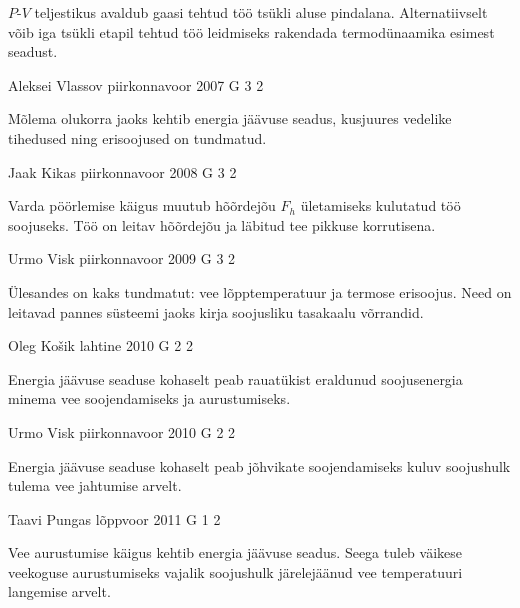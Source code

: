 \documentclass[11pt]{article}
\begin{document}
{{\ifHint
$P$-$V$ teljestikus avaldub gaasi tehtud töö tsükli aluse pindalana. Alternatiivselt võib iga tsükli etapil tehtud töö leidmiseks rakendada termodünaamika esimest seadust.
\fi
}

{Aleksei Vlassov} %
{piirkonnavoor} %
{2007} %
{G 3} %
{2} %
{

\ifHint
Mõlema olukorra jaoks kehtib energia jäävuse seadus, kusjuures vedelike tihedused ning erisoojused on tundmatud.
\fi
}

{Jaak Kikas} %
{piirkonnavoor} %
{2008} %
{G 3} %
{2} %
{

\ifHint
Varda pöörlemise käigus muutub hõõrdejõu $F_h$ ületamiseks kulutatud töö soojuseks. Töö on leitav hõõrdejõu ja läbitud tee pikkuse korrutisena.
\fi
}

{Urmo Visk} %
{piirkonnavoor} %
{2009} %
{G 3} %
{2} %
{

\ifHint
Ülesandes on kaks tundmatut: vee lõpptemperatuur ja termose erisoojus. Need on leitavad pannes süsteemi jaoks kirja soojusliku tasakaalu võrrandid.
\fi
}

{Oleg Košik} %
{lahtine} %
{2010} %
{G 2} %
{2} %
{

\ifHint
Energia jäävuse seaduse kohaselt peab rauatükist eraldunud soojusenergia minema vee soojendamiseks ja aurustumiseks.
\fi
}

{Urmo Visk} %
{piirkonnavoor} %
{2010} %
{G 2} %
{2} %
{

\ifHint
Energia jäävuse seaduse kohaselt peab jõhvikate soojendamiseks kuluv soojushulk tulema vee jahtumise arvelt.
\fi
}

{Taavi Pungas} %
{lõppvoor} %
{2011} %
{G 1} %
{2} %
{

\ifHint
Vee aurustumise käigus kehtib energia jäävuse seadus. Seega tuleb väikese veekoguse aurustumiseks vajalik soojushulk järelejäänud vee temperatuuri langemise arvelt.
\fi
}

}
\end{document}
